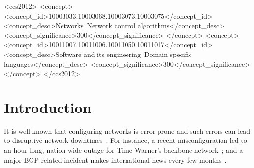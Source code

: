 \documentclass[10pt]{sigalternate052015}
\newcommand{\dpw}[1]{\textcolor{tmlblue}{[dpw: #1]}}
\begin{document}
%
%
%
%


\begin{CCSXML}
<ccs2012>
<concept>
<concept_id>10003033.10003068.10003073.10003075</concept_id>
<concept_desc>Networks~Network control algorithms</concept_desc>
<concept_significance>300</concept_significance>
</concept>
<concept>
<concept_id>10011007.10011006.10011050.10011017</concept_id>
<concept_desc>Software and its engineering~Domain specific languages</concept_desc>
<concept_significance>300</concept_significance>
</concept>
</ccs2012>
\end{CCSXML}


\printccsdesc



%
%
%
%


\section{Introduction}
\label{sec:introduction}

It is well known that configuring networks is error
prone and such errors can lead to disruptive network
downtimes~\cite{mahajan+:bgp-misconfiguration,feamster+:rcc,batfish,dc-failure-study}.
For instance, a recent misconfiguration led to an hour-long, nation-wide outage for Time Warner's backbone network~\cite{time-warner}; and a major BGP-related incident makes international news every few months~\cite{bgpmon}.

\end{document}
